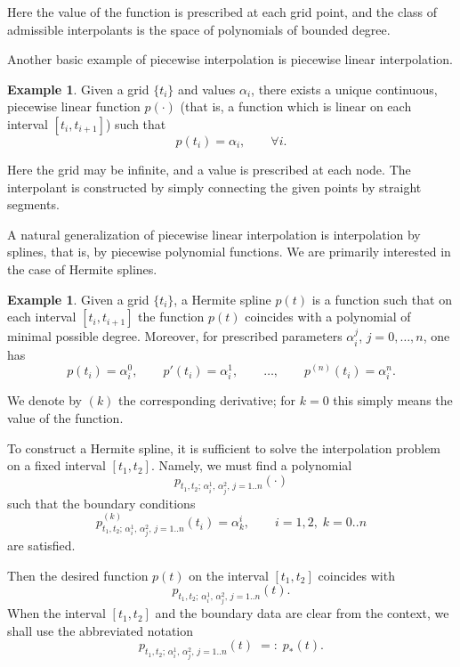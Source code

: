 \documentclass{article}
\theoremstyle{definition}
\newtheorem{example}[theorem]{Example}
\theoremstyle{definition}
\numberwithin{figure}{section}
\newcommand{\1}{\mathbf{1}}
\begin{document}
Here the value of the function is prescribed at each grid point, and the class of admissible interpolants is the space of polynomials of bounded degree.

\smallskip

Another basic example of piecewise interpolation is piecewise linear interpolation.

\begin{example}\label{ex-lin-int}
Given a grid $\{t_i\}$ and values $\alpha_i$, there exists a unique continuous, piecewise linear function $p(\cdot)$ (that is, a function which is linear on each interval $[t_i, t_{i+1}]$) such that
\[
    p(t_i) = \alpha_i,\qquad \forall i.
\]
\end{example}

Here the grid may be infinite, and a value is prescribed at each node. The interpolant is constructed by simply connecting the given points by straight segments.

\smallskip

A natural generalization of piecewise linear interpolation is interpolation by splines, that is, by piecewise polynomial functions. We are primarily interested in the case of Hermite splines.

\begin{example}\label{ex-ermit}
Given a grid $\{t_i\}$, a Hermite spline $p(t)$ is a function such that on each interval $[t_i, t_{i+1}]$ the function $p(t)$ coincides with a polynomial of minimal possible degree. Moreover, for prescribed parameters $\alpha_i^j$, $j = 0,\ldots,n$, one has
\[
    p(t_i) = \alpha_i^0,\qquad
    p'(t_i) = \alpha_i^1,\qquad
    \ldots,\qquad
    p^{(n)}(t_i) = \alpha_i^n.
\]
\end{example}

We denote by $(k)$ the corresponding derivative; for $k=0$ this simply means the value of the function.

\bigskip

To construct a Hermite spline, it is sufficient to solve the interpolation problem on a fixed interval $[t_1, t_2]$. Namely, we must find a polynomial
\[
    p_{t_1, t_2;\,\alpha_i^1,\,\alpha_j^2,\, j = 1..n}(\cdot)
\]
such that the boundary conditions
\begin{equation}\label{eq-bordercond}
    p_{t_1, t_2;\,\alpha_i^1,\,\alpha_j^2,\, j = 1..n}^{(k)}(t_i)
    = \alpha_k^i,\qquad i = 1,2,\; k = 0..n
\end{equation}
are satisfied.

Then the desired function $p(t)$ on the interval $[t_1, t_2]$ coincides with
\[
    p_{t_1, t_2;\,\alpha_i^1,\,\alpha_j^2,\, j = 1..n}(t).
\]
When the interval $[t_1, t_2]$ and the boundary data are clear from the context, we shall use the abbreviated notation
\begin{equation}
    p_{t_1, t_2;\,\alpha_i^1,\,\alpha_j^2,\, j = 1..n}(t) \;=:\; p_*(t).
\end{equation}
\end{document}
